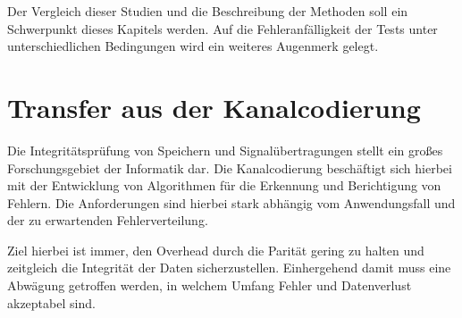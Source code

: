 Der Vergleich dieser Studien und die Beschreibung der Methoden soll ein Schwerpunkt dieses Kapitels werden.
Auf die Fehleranfälligkeit der Tests unter unterschiedlichen Bedingungen wird ein weiteres Augenmerk gelegt.

\section{Transfer aus der Kanalcodierung}
Die Integritätsprüfung von Speichern und Signalübertragungen stellt ein großes Forschungsgebiet der Informatik dar.
Die Kanalcodierung beschäftigt sich hierbei mit der Entwicklung von Algorithmen für die Erkennung und Berichtigung von Fehlern.
Die Anforderungen sind hierbei stark abhängig vom Anwendungsfall und der zu erwartenden Fehlerverteilung.

Ziel hierbei ist immer, den Overhead durch die Parität gering zu halten und zeitgleich die Integrität der Daten sicherzustellen.
Einhergehend damit muss eine Abwägung getroffen werden, in welchem Umfang Fehler und Datenverlust akzeptabel sind.


